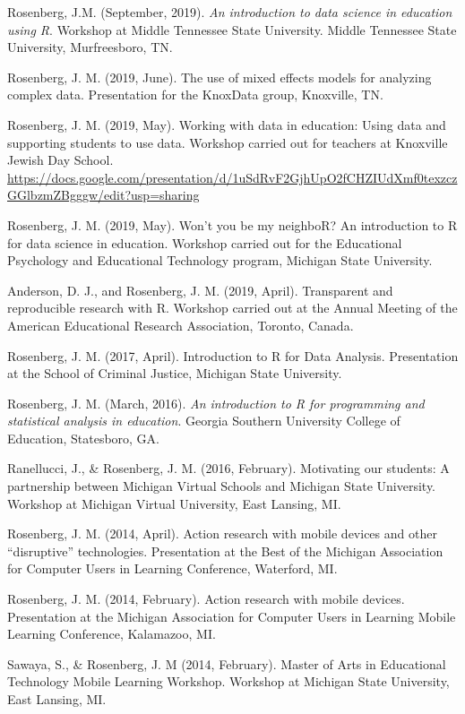\documentclass[14,]{article}
\begin{document}
Rosenberg, J.M. (September, 2019). \emph{An introduction to data science
in education using R}. Workshop at Middle Tennessee State University.
Middle Tennessee State University, Murfreesboro, TN.

Rosenberg, J. M. (2019, June). The use of mixed effects models for
analyzing complex data. Presentation for the KnoxData group, Knoxville,
TN.

Rosenberg, J. M. (2019, May). Working with data in education: Using data
and supporting students to use data. Workshop carried out for teachers
at Knoxville Jewish Day School.
\url{https://docs.google.com/presentation/d/1uSdRvF2GjhUpO2fCHZIUdXmf0texzczGGlbzmZBgggw/edit?usp=sharing}

Rosenberg, J. M. (2019, May). Won't you be my neighboR? An introduction
to R for data science in education. Workshop carried out for the
Educational Psychology and Educational Technology program, Michigan
State University.

Anderson, D. J., and Rosenberg, J. M. (2019, April). Transparent and
reproducible research with R. Workshop carried out at the Annual Meeting
of the American Educational Research Association, Toronto, Canada.

Rosenberg, J. M. (2017, April). Introduction to R for Data Analysis.
Presentation at the School of Criminal Justice, Michigan State
University.

Rosenberg, J. M. (March, 2016). \emph{An introduction to R for
programming and statistical analysis in education}. Georgia Southern
University College of Education, Statesboro, GA.

Ranellucci, J., \& Rosenberg, J. M. (2016, February). Motivating our
students: A partnership between Michigan Virtual Schools and Michigan
State University. Workshop at Michigan Virtual University, East Lansing,
MI.

Rosenberg, J. M. (2014, April). Action research with mobile devices and
other ``disruptive'' technologies. Presentation at the Best of the
Michigan Association for Computer Users in Learning Conference,
Waterford, MI.

Rosenberg, J. M. (2014, February). Action research with mobile devices.
Presentation at the Michigan Association for Computer Users in Learning
Mobile Learning Conference, Kalamazoo, MI.

Sawaya, S., \& Rosenberg, J. M (2014, February). Master of Arts in
Educational Technology Mobile Learning Workshop. Workshop at Michigan
State University, East Lansing, MI.
\end{document}

